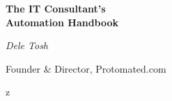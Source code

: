 \documentclass[11pt,letterpaper,openany]{book}
\begin{document}
    \frontmatter

    \begin{titlepage}
        \centering
        \vspace*{2cm}
        {\Huge\bfseries\color{primarydark} The IT Consultant's\\ Automation Handbook\par}
        \vspace{2cm}
        {\Large\itshape Dele Tosh\par}
        \vspace{1cm}
        {\large Founder \& Director, Protomated.com\par}
        \vfill
        {\large \currentmonthyear\par}
    \end{titlepage}

    \tableofcontents

    \mainmatter

    
%    
    
    
    

    \backmatter
z
    
    


\end{document}
